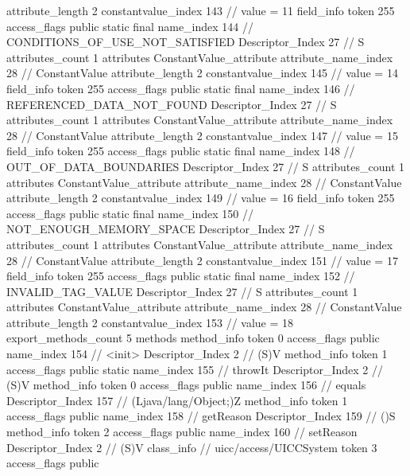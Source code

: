 {{{{{{{					attribute_length	2
					constantvalue_index	143		// value = 11
				}
				}
			}
			field_info {
				token	255
				access_flags	public static final
				name_index	144		// CONDITIONS_OF_USE_NOT_SATISFIED
				Descriptor_Index	27		// S
				attributes_count	1
				attributes {
				ConstantValue_attribute {
					attribute_name_index	28		// ConstantValue
					attribute_length	2
					constantvalue_index	145		// value = 14
				}
				}
			}
			field_info {
				token	255
				access_flags	public static final
				name_index	146		// REFERENCED_DATA_NOT_FOUND
				Descriptor_Index	27		// S
				attributes_count	1
				attributes {
				ConstantValue_attribute {
					attribute_name_index	28		// ConstantValue
					attribute_length	2
					constantvalue_index	147		// value = 15
				}
				}
			}
			field_info {
				token	255
				access_flags	public static final
				name_index	148		// OUT_OF_DATA_BOUNDARIES
				Descriptor_Index	27		// S
				attributes_count	1
				attributes {
				ConstantValue_attribute {
					attribute_name_index	28		// ConstantValue
					attribute_length	2
					constantvalue_index	149		// value = 16
				}
				}
			}
			field_info {
				token	255
				access_flags	public static final
				name_index	150		// NOT_ENOUGH_MEMORY_SPACE
				Descriptor_Index	27		// S
				attributes_count	1
				attributes {
				ConstantValue_attribute {
					attribute_name_index	28		// ConstantValue
					attribute_length	2
					constantvalue_index	151		// value = 17
				}
				}
			}
			field_info {
				token	255
				access_flags	public static final
				name_index	152		// INVALID_TAG_VALUE
				Descriptor_Index	27		// S
				attributes_count	1
				attributes {
				ConstantValue_attribute {
					attribute_name_index	28		// ConstantValue
					attribute_length	2
					constantvalue_index	153		// value = 18
				}
				}
			}
			}
			export_methods_count	5
			methods {
				method_info {
					token	0
					access_flags	public
					name_index	154		// <init>
					Descriptor_Index	2		// (S)V
				}
				method_info {
					token	1
					access_flags	public static
					name_index	155		// throwIt
					Descriptor_Index	2		// (S)V
				}
				method_info {
					token	0
					access_flags	public
					name_index	156		// equals
					Descriptor_Index	157		// (Ljava/lang/Object;)Z
				}
				method_info {
					token	1
					access_flags	public
					name_index	158		// getReason
					Descriptor_Index	159		// ()S
				}
				method_info {
					token	2
					access_flags	public
					name_index	160		// setReason
					Descriptor_Index	2		// (S)V
				}
			}
		}
		class_info {		// uicc/access/UICCSystem
			token	3
			access_flags	public
}}}
